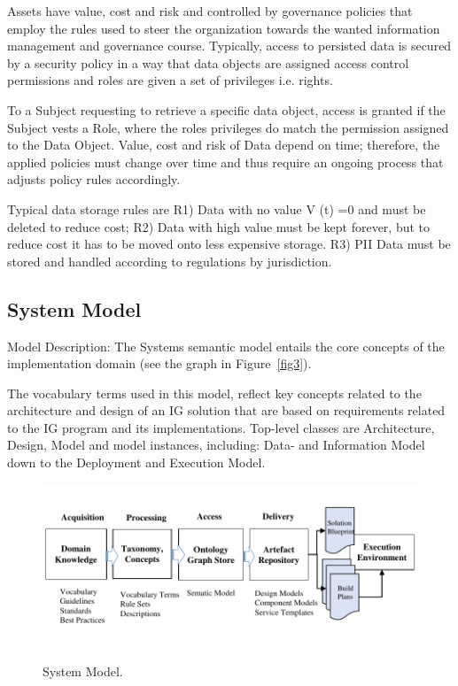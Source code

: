 \documentclass[runningheads]{llncs}
\begin{document}
Assets have value, cost and risk and controlled by governance policies that employ the rules used to steer the organization towards the wanted information management and governance course.  
Typically, access to persisted data is secured by a security policy in a way that data objects are assigned access control permissions and roles are given a set of privileges i.e. rights. 

To a Subject requesting to retrieve a specific data object, access is granted if the Subject vests a Role, where the roles privileges do match the permission assigned to the Data Object. 
Value, cost and risk of Data depend on time; therefore, the applied policies must change over time and thus require an ongoing process that adjusts policy rules accordingly. 

Typical data storage rules are R1) Data with no value V (t) =0 and must be deleted to reduce cost; R2) Data with high value must be kept forever, but to reduce cost it has to be moved onto less expensive storage. R3) PII Data must be stored and handled according to regulations by jurisdiction.
\subsection{System Model}

Model Description: The Systems semantic model entails the core concepts of the implementation domain (see the graph in Figure~\ref{fig3}). 

The vocabulary terms used in this model, reflect key concepts related to the architecture and design of an IG solution that are based on requirements related to the IG program and its implementations. Top-level classes are Architecture, Design, Model and model instances, including: Data- and Information Model down to the Deployment and Execution Model.

\begin{figure}[h] 
 \centering
\includegraphics[page=7,trim=0 0.5cm 0 0.5cm,clip, width=\textwidth]{figs/IGSModelsMedium.pdf}
\caption{System Model.} \label{fig7}
\end{figure}
\end{document}

